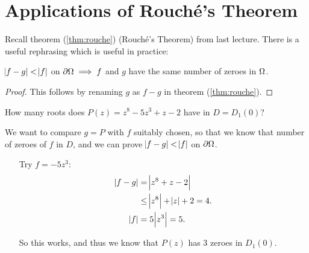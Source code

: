 \setcounter{section}{0}
\setcounter{theorem}{0}


\section{Applications of Rouché's Theorem}


Recall theorem (\ref{thm:rouche}) (Rouché's Theorem) from last lecture. There is a useful rephrasing which is useful in practice:

\begin{corollary}\label{thm:rouche2}
$\abs{f-g} < \abs{f}$ on $\partial \Omega \implies f$ and $g$ have the same number of zeroes in $\Omega$. 
\end{corollary}

\begin{proof}

This follows by renaming $g$ as $f-g$ in theorem (\ref{thm:rouche}).

\end{proof}

\begin{example}
How many roots does $P(z) = z^8-5z^3+z-2$ have in $D=D_1(0)$?

We want to compare $g=P$ with $f$ suitably chosen, so that we know that number of zeroes of $f$ in $D$, and we can prove $\abs{f-g} < \abs{f}$ on $\partial \Omega$.


\begin{enumerate}
    \item[Try] $f=-5z^3$:
    \begin{align*}
        \abs{f-g} &= \abs{z^8+z-2}\\
        &\leq \abs{z^8} + \abs{z} +2 = 4.\\
        \abs{f} &= 5\abs{z^3} = 5.
    \end{align*}
    
    So this works, and thus we know that $P(z)$ has $3$ zeroes in $D_1(0)$.
    
\end{enumerate}


\end{example}




